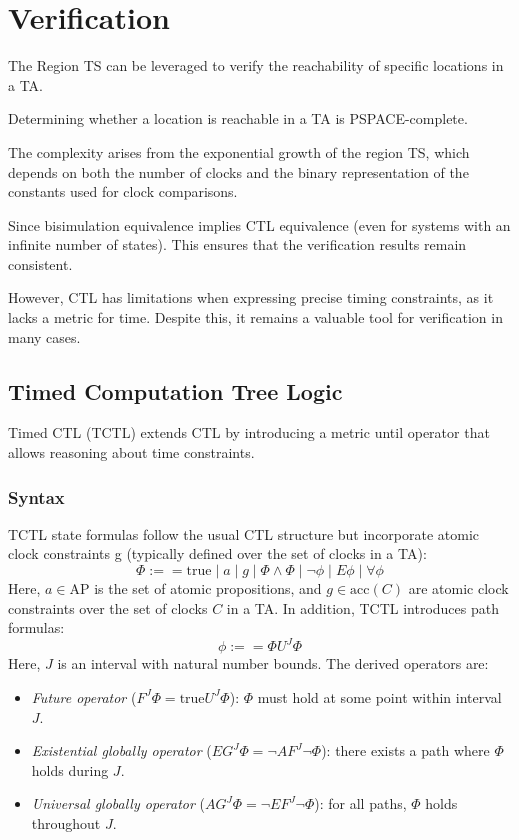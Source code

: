 \section{Verification}

The Region TS can be leveraged to verify the reachability of specific locations in a TA.
\begin{theorem}
    Determining whether a location is reachable in a TA is PSPACE-complete.
\end{theorem}
\noindent The complexity arises from the exponential growth of the region TS, which depends on both the number of clocks and the binary representation of the constants used for clock comparisons.

Since bisimulation equivalence implies CTL equivalence (even for systems with an infinite number of states).
This ensures that the verification results remain consistent.

However, CTL has limitations when expressing precise timing constraints, as it lacks a metric for time. 
Despite this, it remains a valuable tool for verification in many cases.

\subsection{Timed Computation Tree Logic}
Timed CTL (TCTL) extends CTL by introducing a metric until operator that allows reasoning about time constraints.

\subsubsection{Syntax}
TCTL state formulas follow the usual CTL structure but incorporate atomic clock constraints g (typically defined over the set of clocks in a TA):
\[\Phi:==\text{true}\mid a \mid g \mid \Phi \land \Phi \mid \lnot\phi \mid E\phi\mid \forall\phi\]
\noindent Here, $a\in\text{AP}$ is the set of atomic propositions, and $g\in\text{acc}(C)$ are atomic clock constraints over the set of clocks $C$ in a TA. 
In addition, TCTL introduces path formulas:
\[\phi:==\Phi U^J\Phi\]
\noindent Here, $J$ is an interval with natural number bounds.
The derived operators are: 
\begin{itemize}
    \item \textit{Future operator} ($F^J\Phi=\text{true}U^J\Phi$): $\Phi$ must hold at some point within interval $J$.
    \item \textit{Existential globally operator} ($EG^J\Phi=\lnot AF^J\lnot\Phi$): there exists a path where $\Phi$ holds during $J$.
    \item \textit{Universal globally operator} ($AG^J\Phi=\lnot EF^J\lnot\Phi$): for all paths, $\Phi$ holds throughout $J$.
\end{itemize}

